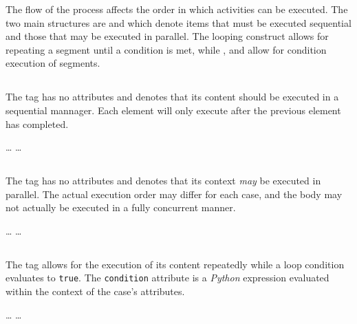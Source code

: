 The flow of the process affects the order in which activities can be
executed.  The two main structures are  and
 which denote items that must be executed sequential
and those that may be executed in parallel.  The  looping
construct allows for repeating a segment until a condition is met,
while ,  and  allow for condition
execution of segments.

\subsection{}

The  tag has no attributes and denotes that its
content should be executed in a sequential mannager.  Each element
will only execute after the previous element has completed.

\begin{codelisting}
    \dots
    \dots
{}
\end{codelisting}

\subsection{}

The  tag has no attributes and denotes that
its context \emph{may} be executed in parallel.  The actual
execution order may differ for each case, and the body may
not actually be executed in a fully concurrent manner.

\begin{codelisting}
    \dots
    \dots
{}
\end{codelisting}


\subsection{}

The  tag allows for the execution of its content
repeatedly while a loop condition evaluates to \verb|true|.
The \verb|condition| attribute is a \emph{Python} expression
evaluated within the context of the case's attributes.

\begin{codelisting}
    \dots
    \dots
{}
\end{codelisting}

